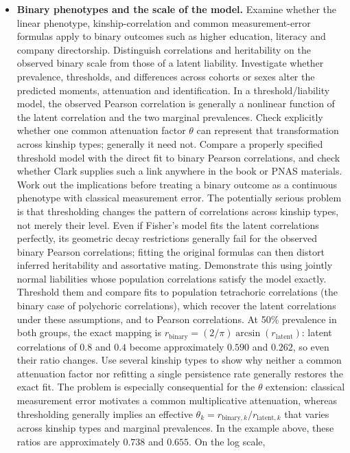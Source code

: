\begin{itemize}
\item \textbf{Binary phenotypes and the scale of the model.}
Examine whether the linear phenotype, kinship-correlation and common
measurement-error formulas apply to binary outcomes such as higher
education, literacy and company directorship. Distinguish correlations
and heritability on the observed binary scale from those of a latent
liability. Investigate whether prevalence, thresholds, and differences
across cohorts or sexes alter the predicted moments, attenuation and
identification. In a threshold/liability model, the observed Pearson
correlation is generally a nonlinear function of the latent correlation
and the two marginal prevalences. Check explicitly whether one common
attenuation factor $\theta$ can represent that transformation across
kinship types; generally it need not. Compare a properly specified
threshold model with the direct fit to binary Pearson correlations, and
check whether Clark supplies such a link anywhere in the book or PNAS
materials. Work out the implications before treating a binary outcome
as a continuous phenotype with classical measurement error.
The potentially serious problem is that thresholding changes the pattern
of correlations across kinship types, not merely their level. Even if
Fisher's model fits the latent correlations perfectly, its geometric
decay restrictions generally fail for the observed binary Pearson
correlations; fitting the original formulas can then distort inferred
heritability and assortative mating. Demonstrate this using jointly
normal liabilities whose population correlations satisfy the model
exactly. Threshold them and compare fits to population tetrachoric
correlations (the binary case of polychoric correlations), which recover
the latent correlations under these assumptions, and to Pearson
correlations. At 50\% prevalence in both groups, the exact mapping is
$r_{\mathrm{binary}}=(2/\pi)\arcsin(r_{\mathrm{latent}})$: latent correlations
of $0.8$ and $0.4$ become approximately $0.590$ and $0.262$, so even their
ratio changes. Use several kinship types to show why neither a common
attenuation factor nor refitting a single persistence rate generally
restores the exact fit. The problem is especially consequential for the
$\theta$ extension: classical measurement error motivates a common
multiplicative attenuation, whereas thresholding generally implies an
effective $\theta_k=r_{\mathrm{binary},k}/r_{\mathrm{latent},k}$ that varies
across kinship types and marginal prevalences. In the example above,
these ratios are approximately $0.738$ and $0.655$. On the log scale,

\end{itemize}
